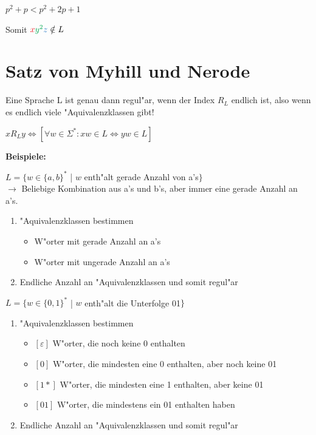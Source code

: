 \documentclass[11pt, a4paper]{scrartcl}
\newcommand{\gr}[1]{{\color{Green}#1}}
\newcommand{\bl}[1]{{\color{RoyalBlue}#1}}
\newcommand{\rd}[1]{{\color{Red}#1}}
\begin{document}
$p^2 + p < p^2 + 2p + 1$

\vspace{0.5em}

Somit $\rd{x}\gr{y^2}\bl{z} \notin L$





\newpage

\section{Satz von Myhill und Nerode}

Eine Sprache L ist genau dann regul"ar, wenn der Index $R_L$ endlich ist, also wenn es endlich viele "Aquivalenzklassen gibt!

\vspace{0.5em}

$xR_Ly \Leftrightarrow [\forall w \in \Sigma^* : xw \in L \Leftrightarrow yw \in L]$

\vspace{3em}

\textbf{Beispiele:}

\vspace{2em}

$L = \{w \in \{a,b\}^*$ | $w$ enth"alt gerade Anzahl von a's$\}$ \\
$\rightarrow$ Beliebige Kombination aus a's und b's, aber immer eine gerade Anzahl an a's.

\begin{enumerate}
    \item "Aquivalenzklassen bestimmen
    \begin{itemize}
        \item W"orter mit gerade Anzahl an a's
        \item W"orter mit ungerade Anzahl an a's
    \end{itemize}
    \item Endliche Anzahl an "Aquivalenzklassen und somit regul"ar
\end{enumerate}

\vspace{3em}

$L = \{w \in \{0,1\}^*$ | $w$ enth"alt die Unterfolge 01$\}$

\begin{enumerate}
    \item "Aquivalenzklassen bestimmen
    \begin{itemize}
        \item $[\varepsilon]$ W"orter, die noch keine 0 enthalten
        \item $[0]$ W"orter, die mindesten eine 0 enthalten, aber noch keine 01
        \item $[1*]$ W"orter, die mindesten eine 1 enthalten, aber keine 01
        \item $[01]$ W"orter, die mindestens ein 01 enthalten haben
    \end{itemize}
    \item Endliche Anzahl an "Aquivalenzklassen und somit regul"ar
\end{enumerate}
\end{document}
